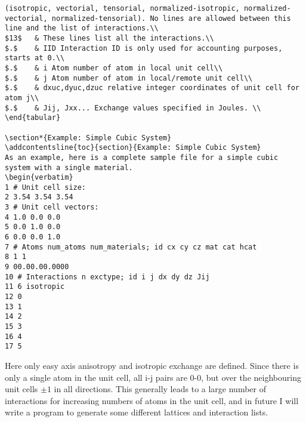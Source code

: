 \begin{verbatim}
(isotropic, vectorial, tensorial, normalized-isotropic, normalized-vectorial, normalized-tensorial). No lines are allowed between this line and the list of interactions.\\
$13$   & These lines list all the interactions.\\
$.$	   & IID Interaction ID is only used for accounting purposes, starts at 0.\\
$.$	   & i Atom number of atom in local unit cell\\
$.$    & j Atom number of atom in local/remote unit cell\\
$.$    & dxuc,dyuc,dzuc relative integer coordinates of unit cell for atom j\\
$.$    & Jij, Jxx... Exchange values specified in Joules. \\
\end{tabular}

\section*{Example: Simple Cubic System}
\addcontentsline{toc}{section}{Example: Simple Cubic System}
As an example, here is a complete sample file for a simple cubic system with a single material.
\begin{verbatim}
1 # Unit cell size:
2 3.54 3.54 3.54
3 # Unit cell vectors:
4 1.0 0.0 0.0
5 0.0 1.0 0.0
6 0.0 0.0 1.0
7 # Atoms num_atoms num_materials; id cx cy cz mat cat hcat
8 1 1
9 00.00.00.0000
10 # Interactions n exctype; id i j dx dy dz Jij
11 6 isotropic
12 0
13 1
14 2
15 3
16 4
17 5
\end{verbatim}
Here only easy axis anisotropy and isotropic exchange are defined. Since there is only a single atom in the unit cell, all i-j pairs are 0-0, but over the neighbouring unit cells $\pm 1$ in all directions. This generally
leads to a large number of interactions for increasing numbers of atoms in the unit cell, and in future I will write a program to generate some different lattices and interaction lists.
 








%
